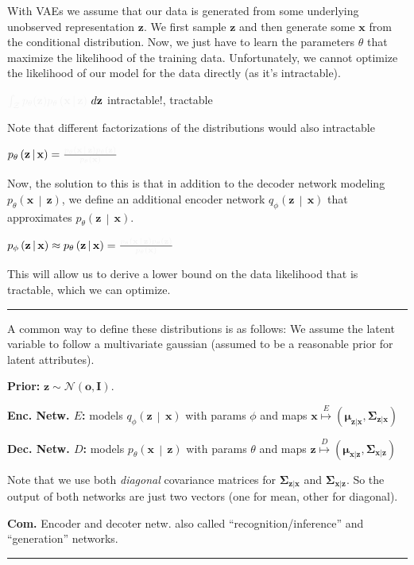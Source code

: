 \documentclass[a2paper,8pt]{extarticle}
\makeatletter
\newcommand{\tcr}[1]{\textcolor{lighttext}{#1}}
\newcommand{\tcg}[1]{\textcolor{lighttext}{#1}}
\newcommand{\tcr}[1]{\textcolor{red}{#1}}
\newcommand{\tcg}[1]{\textcolor{green}{#1}}
\def\mc#1#{\@mc{#1}}
\def\@mc#1#2#3{%
  \protect\leavevmode
  \begingroup
    \color#1{#2}#3%
  \endgroup
}
\newcommand{\mcr}[1]{\mc{lighttext}{#1}}
\newcommand{\mcg}[1]{\mc{lighttext}{#1}}
\newcommand{\mcr}[1]{\mc{red}{#1}}
\newcommand{\mcg}[1]{\mc{green}{#1}}
\newcommand{\cN}{\mathcal{N}}
\newcommand{\cZ}{\mathcal{Z}}
\newcommand{\Dist}[2]{#1\left( #2 \right)}
\newcommand{\cDist}[3]{#1\left( #2 \,\middle|\, #3 \right)}
\newcommand{\mat}[1]{\mathbf{#1}}
\renewcommand{\vec}[1]{\mathbf{#1}}
\newcommand{\vo}{\vec{o}}
\newcommand{\vx}{\vec{x}}
\newcommand{\vz}{\vec{z}}
\newcommand{\vmu}{\boldsymbol{\mu}}
\newcommand{\MI}{\mat{I}}
\newcommand{\MSigma}{\mat{\Sigma}}
\newcommand{\Com}{\textbf{Com.} }
\newcommand{\sep}{\vspace{0pt}\noindent\hrule\vspace{0pt}}
\newcommand{\sep}{\vspace{5pt}\noindent\hrule\vspace{5pt}}
\makeatother
\begin{document}
\begin{landscape}
\begin{multicols*}{7}
With VAEs we assume that our data is generated from some underlying unobserved
representation $\vz$. We first sample $\vz$ and then generate some $\vx$ from
the conditional distribution. Now, we just have to learn the parameters $\theta$
that maximize the likelihood of the training data. Unfortunately, we cannot
optimize the likelihood of our model for the data directly (as it's
intractable). 

$\mcr{\int_{\cZ}} \mcg{p_\theta(\vz)}\mcg{\cDist{p_\theta}{\vx}{\vz}} \,d\vz$
\quad\tcr{intractable!}, \tcg{tractable}

Note that different factorizations of the distributions would also intractable

$\cDist{p_\theta}{\vz}{\vx}=\frac{\tcg{\cDist{p_\theta}{\vx}{\vz}
\Dist{p_\theta}{\vz}}}{\tcr{\Dist{p_\theta}{\vx}}}$

Now, the solution to this is that in addition to the decoder network modeling
$\cDist{p_\theta}{\vx}{\vz}$, we define an additional encoder network
$\cDist{q_\phi}{\vz}{\vx}$ that approximates $\cDist{p_\theta}{\vz}{\vx}$.

$
\cDist{p_\phi}{\vz}{\vx}
\approx
\cDist{p_\theta}{\vz}{\vx}=\frac{\tcg{\cDist{p_\theta}{\vx}{\vz}
\Dist{p_\theta}{\vz}}}{\tcr{\Dist{p_\theta}{\vx}}}
$

This will allow us to derive a lower bound on the data likelihood that is
tractable, which we can optimize.

\sep

A common way to define these distributions is as follows: We assume the latent
variable to follow a multivariate gaussian (assumed to be a reasonable prior for
latent attributes).

\textbf{Prior:} $\vz\sim\cN(\vo,\MI)$.

\textbf{Enc. Netw. $E$:} models $\cDist{q_\phi}{\vz}{\vx}$ with params
$\phi$ and maps $\vx\stackrel{E}{\mapsto}(\vmu_{\vz|\vx},\MSigma_{\vz|\vx})$

\textbf{Dec. Netw. $D$:} models $\cDist{p_\theta}{\vx}{\vz}$ with params
$\theta$ and maps $\vz\stackrel{D}{\mapsto}(\vmu_{\vx|\vz},\MSigma_{\vx|\vz})$

Note that we use both \emph{diagonal} covariance matrices for
$\MSigma_{\vz|\vx}$ and $\MSigma_{\vx|\vz}$. So the output of both networks are
just two vectors (one for mean, other for diagonal).

\Com Encoder and decoter netw. also called ``recognition/inference'' and
``generation'' networks.

\sep


\end{multicols*}
\end{landscape}
\end{document}
